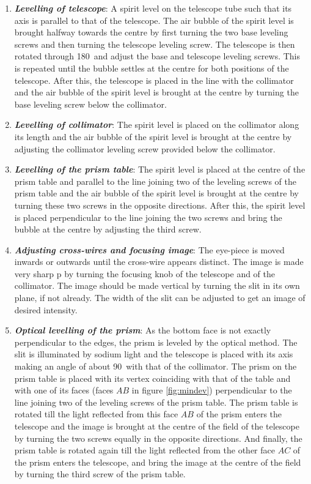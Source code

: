 \documentclass[%
 reprint,
 amsmath,amssymb,
 aps,
]{revtex4-2}
\begin{document}
    \begin{enumerate}[label=(\roman*)]
        \item \textbf{\textit{Levelling of telescope}}: A spirit level on the telescope tube such that its axis is parallel to that of the telescope. The air bubble of the spirit level is brought halfway towards the centre by first turning the two base leveling screws and then turning the telescope leveling screw. The telescope is then rotated through 180\degree\ and adjust the base and telescope leveling screws. This is repeated until the bubble settles at the centre for both positions of the telescope. After this, the telescope is placed in the line with the collimator and the air bubble of the spirit level is brought at the centre by turning the base leveling screw below the collimator.
        \item \textbf{\textit{Levelling of collimator}}: The spirit level is placed on the collimator along its length and the air bubble of the spirit level is brought at the centre by adjusting the collimator leveling screw provided below the collimator.
        \item \textbf{\textit{Levelling of the prism table}}: The spirit level is placed at the centre of the prism table and parallel to the line joining two of the leveling screws of the prism table and the air bubble of the spirit level is brought at the centre by turning these two screws in the opposite directions. After this, the spirit level is placed perpendicular to the line joining the two screws and bring the bubble at the centre by adjusting the third screw.
        \item \textbf{\textit{Adjusting cross-wires and focusing image}}: The eye-piece is moved inwards or outwards until the cross-wire appears distinct. The image is made very sharp p by turning the focusing knob of the telescope and of the collimator. The image should be made vertical by turning the slit in its own plane, if not already. The width of the slit can be adjusted to get an image of desired intensity. 
        \item \textbf{\textit{Optical levelling of the prism}}: As the bottom face is not exactly perpendicular to the edges, the prism is leveled by the optical method. The slit is illuminated by sodium light and the telescope is placed with its axis making an angle of about 90\degree\ with that of the collimator. The prism on the prism table is placed with its vertex coinciding with that of the table and with one of its faces (faces $AB$ in figure \ref{fig:mindev}) perpendicular to the line joining two of the leveling screws of the prism table. The prism table is rotated till the light reflected from this face $AB$ of the prism enters the telescope and the image is brought at the centre of the field of the telescope by turning the two screws equally in the opposite directions. And finally, the prism table is rotated again till the light reflected from the other face $AC$ of the prism enters the telescope, and bring the image at the centre of the field by turning the third screw of the prism table.

\end{enumerate}
\end{document}
